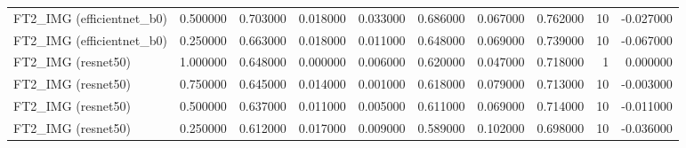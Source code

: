 \begin{table}
\begin{tabular}{lrrrrrrrrr}
FT2\_IMG (efficientnet\_b0) & 0.500000 & 0.703000 & 0.018000 & 0.033000 & 0.686000 & 0.067000 & 0.762000 & 10 & -0.027000 \\
FT2\_IMG (efficientnet\_b0) & 0.250000 & 0.663000 & 0.018000 & 0.011000 & 0.648000 & 0.069000 & 0.739000 & 10 & -0.067000 \\
FT2\_IMG (resnet50) & 1.000000 & 0.648000 & 0.000000 & 0.006000 & 0.620000 & 0.047000 & 0.718000 & 1 & 0.000000 \\
FT2\_IMG (resnet50) & 0.750000 & 0.645000 & 0.014000 & 0.001000 & 0.618000 & 0.079000 & 0.713000 & 10 & -0.003000 \\
FT2\_IMG (resnet50) & 0.500000 & 0.637000 & 0.011000 & 0.005000 & 0.611000 & 0.069000 & 0.714000 & 10 & -0.011000 \\
FT2\_IMG (resnet50) & 0.250000 & 0.612000 & 0.017000 & 0.009000 & 0.589000 & 0.102000 & 0.698000 & 10 & -0.036000 \\
\bottomrule
\end{tabular}
\end{table}
